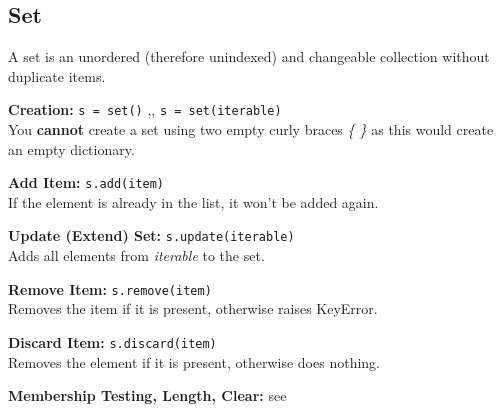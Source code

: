 \subsection{Set}
    A set is an unordered (therefore unindexed) and  changeable collection without duplicate
    items.

    \begin{indentblock}

        \textbf{Creation:} \texttt{s = set()} \sep{,}
        \texttt{s = set(iterable)} \\
        You \textbf{cannot} create a set using two empty curly braces \textit{\{ \}} as this would
        create an empty dictionary.

        \textbf{Add Item:} \texttt{s.add(item)} \\
        If the element is already in the list, it won't be added again.

        \textbf{Update (Extend) Set:} \texttt{s.update(iterable)} \\
        Adds all elements from \textit{iterable} to the set.

        \textbf{Remove Item:} \texttt{s.remove(item)} \\
        Removes the item if it is present, otherwise raises KeyError.

        \textbf{Discard Item:} \texttt{s.discard(item)} \\
        Removes the element if it is present, otherwise does nothing.

        \textbf{Membership Testing, Length, Clear:} see 

    \end{indentblock}
